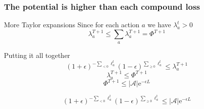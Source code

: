 \documentclass{beamer}
\begin{document}
\begin{frame}
    \frametitle{The potential is higher than each compound loss}

    \begin{block}{More Taylor expansions}
        Since for each action $a$ we have $\lambda_a^t > 0$
    \begin{equation*}
        \lambda_a^{T+1} \leq \sum_a \lambda_a^{T+1} = \Phi^{T+1}
    \end{equation*}
    \end{block}

    \begin{block}{Putting it all together}
        \begin{equation}
            (1 + \epsilon)^{- \sum_{< 0} \ell_a^t}
            (1 - \epsilon)^{\sum_{\geq 0} \ell_a^t}
            \leq \lambda_a^{T+1}
        \end{equation}
        \begin{equation}
            \lambda_a^{T+1} \leq \Phi^{T+1}
        \end{equation}
        \begin{equation}
            \Phi^{T+1} \leq |\mathcal{A}| \mathrm{e}^{- \epsilon L}
        \end{equation}
    \end{block}

    \alert{\begin{equation*}
            (1 + \epsilon)^{- \sum_{< 0} \ell_a^t}
            (1 - \epsilon)^{\sum_{\geq 0} \ell_a^t}
            \leq |\mathcal{A}| \mathrm{e}^{- \epsilon L}
    \end{equation*}}

\end{frame}
\end{document}
